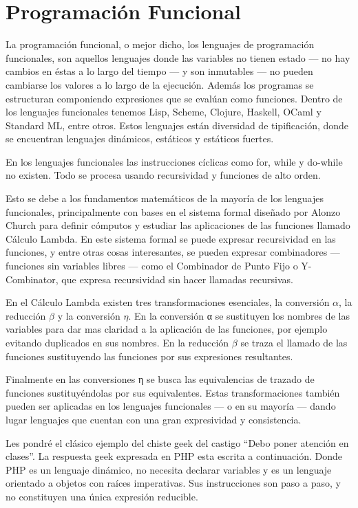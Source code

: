 \documentclass[11pt]{article}
\begin{document}
\section*{Programación Funcional}
\label{sec:org0d92b5b}

La programación funcional, o mejor dicho, los lenguajes de
programación funcionales, son aquellos lenguajes donde las variables
no tienen estado — no hay cambios en éstas a lo largo del tiempo — y
son inmutables — no pueden cambiarse los valores a lo largo de la
ejecución. Además los programas se estructuran componiendo expresiones
que se evalúan como funciones. Dentro de los lenguajes funcionales
tenemos Lisp, Scheme, Clojure, Haskell, OCaml y Standard ML, entre
otros.  Estos lenguajes están diversidad de tipificación, donde se
encuentran lenguajes dinámicos, estáticos y estáticos fuertes.


En los lenguajes funcionales las instrucciones cíclicas como for,
while y do-while no existen. Todo se procesa usando recursividad y
funciones de alto orden.

Esto se debe a los fundamentos matemáticos de la mayoría de los
lenguajes funcionales, principalmente con bases en el sistema formal
diseñado por Alonzo Church para definir cómputos y estudiar las
aplicaciones de las funciones llamado Cálculo Lambda. En este sistema
formal se puede expresar recursividad en las funciones, y entre otras
cosas interesantes, se pueden expresar combinadores — funciones sin
variables libres — como el Combinador de Punto Fijo o Y-Combinator,
que expresa recursividad sin hacer llamadas recursivas.

En el Cálculo Lambda existen tres transformaciones esenciales, la
conversión \(α\), la reducción \(β\) y la conversión \(η\). En la conversión
α se sustituyen los nombres de las variables para dar mas claridad a
la aplicación de las funciones, por ejemplo evitando duplicados en sus
nombres. En la reducción \(β\) se traza el llamado de las funciones
sustituyendo las funciones por sus expresiones resultantes.

Finalmente en las conversiones η se busca las equivalencias de trazado
de funciones sustituyéndolas por sus equivalentes. Estas
transformaciones también pueden ser aplicadas en los lenguajes
funcionales — o en su mayoría — dando lugar lenguajes que cuentan con
una gran expresividad y consistencia.


Les pondré el clásico ejemplo del chiste geek del castigo “Debo poner
atención en clases”. La respuesta geek expresada en PHP esta escrita a
continuación.  Donde PHP es un lenguaje dinámico, no necesita declarar
variables y es un lenguaje orientado a objetos con raíces imperativas.
Sus instrucciones son paso a paso, y no constituyen una única
expresión reducible.
\end{document}
